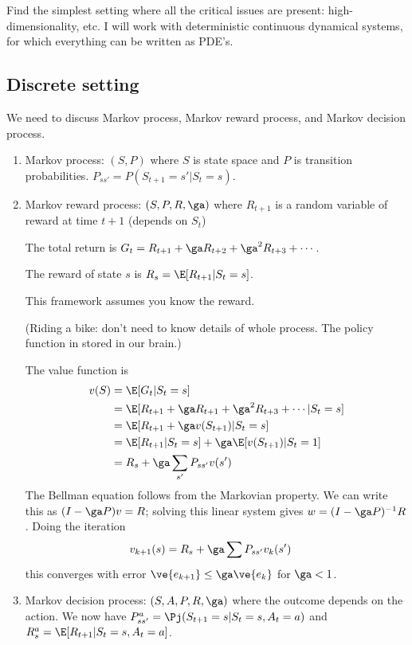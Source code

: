 Find the simplest setting where all the critical issues are present: high-dimensionality, etc. I will work with deterministic continuous dynamical systems, for which everything can be written as PDE's. 


\subsection{Discrete setting}

We need to discuss Markov process, Markov reward process, and Markov decision process.
\begin{enumerate}
\item
Markov process: $(S,P)$ where $S$ is state space and $P$ is transition probabilities. $P_{ss'} = P(S_{t+1}=s'|S_t=s)$.
\item
Markov reward process: $(S,P,R,\ga)$ where $R_{t+1}$ is a random variable of reward at time $t+1$ (depends on $S_t$)

The total return is $G_t=R_{t+1}+\ga R_{t+2}+\ga^2R_{t+3}+\cdots$.

The reward of state $s$ is $R_s=\E[R_{t+1}|S_t=s]$.

This framework assumes you know the reward.

(Riding a bike: don't need to know details of whole process. The policy function in stored in our brain.)

The value function is 
\begin{align}
v(S) &= \E[G_t|S_t=s]\\
&=\E[R_{t+1}+\ga R_{t+1}+\ga^2 R_{t+3}+\cdots|S_t=s]\\
&=\E[R_{t+1}+\ga v(S_{t+1})|S_t=s]\\
&=\E[R_{t+1}|S_t=s] + \ga \E[v(S_{t+1})|S_t=1]\\
&=R_s + \ga \sum_{s'}P_{ss'}v(s')
\end{align}
The Bellman equation follows from the Markovian property. We can write this as 
$(I-\ga P)v = R$; solving this linear system gives $w=(I-\ga P)^{-1}R$. Doing the iteration
\begin{align}
v_{k+1}(s)&=R_s + \ga \sum P_{ss'}v_k(s')
\end{align}
this converges with error $\ve{e_{k+1}}\le \ga\ve{e_k}$ for $\ga<1$. 
\item Markov decision process: $(S,A,P,R,\ga)$ where the outcome depends on the action. We now have $P_{ss'}^a = \Pj(S_{t+1}=s|S_t=s,A_t=a)$ %
and $R_s^a = \E[R_{t+1}|S_t=s,A_t=a]$. 


\end{enumerate}

